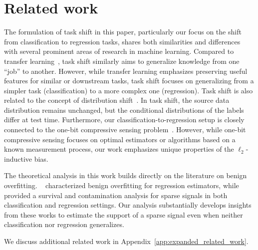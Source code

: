 \section{Related work}
\label{sec:relatedwork}

The formulation of task shift in this paper, particularly our focus on the shift from classification to regression tasks, shares both similarities and differences with several prominent areas of research in machine learning. Compared to transfer learning~\citep{pan2009survey}, task shift similarly aims to generalize knowledge from one ``job'' to another. However, while transfer learning emphasizes preserving useful features for similar or downstream tasks, task shift focuses on generalizing from a simpler task (\eg classification) to a more complex one (\eg regression). Task shift is also related to the concept of distribution shift~\citep{moreno2012unifying}. In task shift, the source data distribution remains unchanged, but the conditional distributions of the labels differ at test time. Furthermore, our classification-to-regression setup is closely connected to the one-bit compressive sensing problem~\citep{boufounos2008one}. However, while one-bit compressive sensing focuses on optimal estimators or algorithms based on a known measurement process, our work emphasizes unique properties of the $\ell_2$-inductive bias.

The theoretical analysis in this work builds directly on the literature on benign overfitting. \cite{bartlett2020benign}~\cite{tsigler2023benign} characterized benign overfitting for regression estimators, while~\cite{muthukumar2021classification} provided a survival and contamination analysis for sparse signals in both classification and regression settings. Our analysis substantially develops insights from these works to estimate the support of a sparse signal even when neither classification nor regression generalizes.

We discuss additional related work in Appendix~\ref{app:expanded_related_work}.